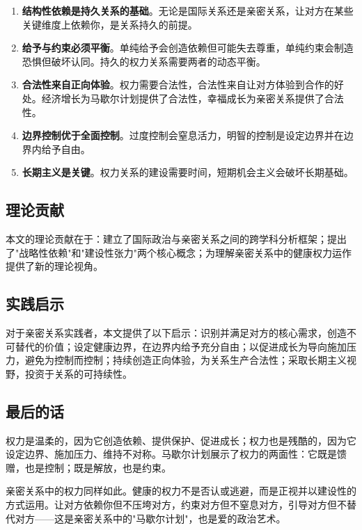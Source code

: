 \documentclass[12pt,a4paper]{article}
\begin{document}
\begin{enumerate}
    \item \textbf{结构性依赖是持久关系的基础}。无论是国际关系还是亲密关系，让对方在某些关键维度上依赖你，是关系持久的前提。
    
    \item \textbf{给予与约束必须平衡}。单纯给予会创造依赖但可能失去尊重，单纯约束会制造恐惧但破坏认同。持久的权力关系需要两者的动态平衡。
    
    \item \textbf{合法性来自正向体验}。权力需要合法性，合法性来自让对方体验到合作的好处。经济增长为马歇尔计划提供了合法性，幸福成长为亲密关系提供了合法性。
    
    \item \textbf{边界控制优于全面控制}。过度控制会窒息活力，明智的控制是设定边界并在边界内给予自由。
    
    \item \textbf{长期主义是关键}。权力关系的建设需要时间，短期机会主义会破坏长期基础。
\end{enumerate}

\subsection{理论贡献}

本文的理论贡献在于：建立了国际政治与亲密关系之间的跨学科分析框架；提出了"战略性依赖"和"建设性张力"两个核心概念；为理解亲密关系中的健康权力运作提供了新的理论视角。

\subsection{实践启示}

对于亲密关系实践者，本文提供了以下启示：识别并满足对方的核心需求，创造不可替代的价值；设定健康边界，在边界内给予充分自由；以促进成长为导向施加压力，避免为控制而控制；持续创造正向体验，为关系生产合法性；采取长期主义视野，投资于关系的可持续性。

\subsection{最后的话}

权力是温柔的，因为它创造依赖、提供保护、促进成长；权力也是残酷的，因为它设定边界、施加压力、维持不对称。马歇尔计划展示了权力的两面性：它既是馈赠，也是控制；既是解放，也是约束。

亲密关系中的权力同样如此。健康的权力不是否认或逃避，而是正视并以建设性的方式运用。让对方依赖你但不压垮对方，约束对方但不窒息对方，引导对方但不替代对方——这是亲密关系中的"马歇尔计划"，也是爱的政治艺术。
\end{document}
